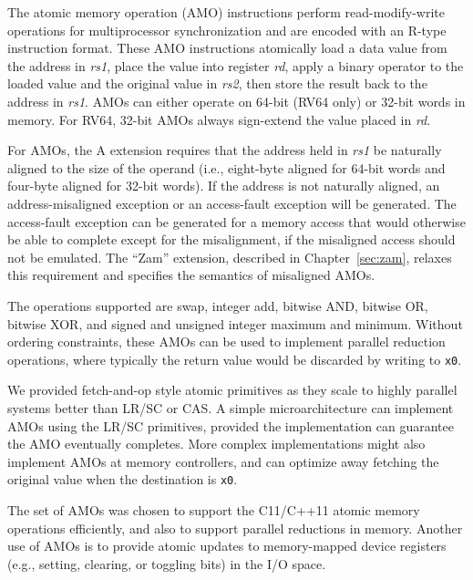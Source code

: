 \vspace{-0.1in} The atomic memory operation (AMO) instructions perform
read-modify-write operations for multiprocessor synchronization and
are encoded with an R-type instruction format.  These AMO instructions
atomically load a data value from the address in {\em rs1}, place the
value into register {\em rd}, apply a binary operator to the loaded
value and the original value in {\em rs2}, then store the result back
to the address in {\em rs1}. AMOs can either operate on 64-bit (RV64
only) or 32-bit words in memory.  For RV64, 32-bit AMOs always
sign-extend the value placed in {\em rd}.

For AMOs, the A extension requires that the address held in {\em rs1}
be naturally aligned to the size of the operand (i.e., eight-byte
aligned for 64-bit words and four-byte aligned for 32-bit words).  If
the address is not naturally aligned, an address-misaligned exception
or an access-fault exception will be generated.  The access-fault exception can be
generated for a memory access that would otherwise be able to complete
except for the misalignment, if the misaligned access should not be
emulated.  The ``Zam'' extension, described in Chapter~\ref{sec:zam},
relaxes this requirement and specifies the semantics of misaligned
AMOs.

The operations supported are swap, integer add, bitwise AND, bitwise
OR, bitwise XOR, and signed and unsigned integer maximum and minimum.
Without ordering constraints, these AMOs can be used to implement
parallel reduction operations, where typically the return value would
be discarded by writing to {\tt x0}.

\begin{commentary}
We provided fetch-and-op style atomic primitives as they scale to
highly parallel systems better than LR/SC or CAS.
A simple microarchitecture can implement AMOs using the LR/SC primitives,
provided the implementation can guarantee the AMO eventually completes.
More complex implementations might also implement AMOs at memory
controllers, and can optimize away fetching the original value when
the destination is {\tt x0}.

The set of AMOs was chosen to support the C11/C++11 atomic memory
operations efficiently, and also to support parallel reductions in
memory.  Another use of AMOs is to provide atomic updates to
memory-mapped device registers (e.g., setting, clearing, or toggling
bits) in the I/O space.
\end{commentary}


